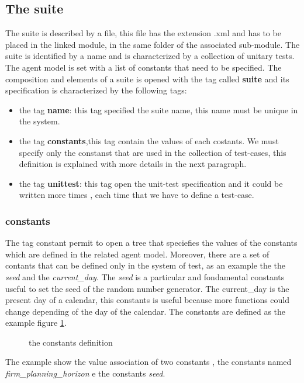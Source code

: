 \documentclass[a4paper,10pt]{article}
\begin{document}
\subsection{The suite}
The suite is described by a file, this file has the extension .xml and  has to be placed in the linked module, in the same folder of the associated sub-module. The suite is identified by a name and is characterized by a collection of unitary tests. The agent model is set with a list of constants that need to be specified.
The composition and elements of a suite is opened with the tag called \textbf{suite} and its specification is characterized by the following tags:

\begin{itemize}
\item the tag \textbf{name}: this tag specified the suite name, this name must be unique in the system.
\item the tag \textbf{constants},this tag contain the values of each costants. We must specify only the constanst that are used in the collection of test-cases, this definition is explained with more details in the next paragraph.
\item the tag \textbf{unittest}: this tag open the unit-test specification and it could be written more times , each time that we have to define a test-case.
\end{itemize}
\subsubsection{constants}
The tag constant permit to open a tree that speciefies the  values of the constants which are defined in the related agent model. Moreover, there are a set of contants that can be defined only in the system of test, as an example the the \textit{seed} and the \textit{current\_day}. The \textit{seed} is a particular and fondamental constants useful to set the seed of the random number generator. The current\_day is the present day of a calendar, this constants is useful because more functions could change depending of the day of the calendar.
The constants are defined as the example figure \ref{fig:fig3}.
\begin{figure}
\label{fig:fig3}

\caption{the constants definition }
\end{figure}
The example show the value association of two constants , the constants named \textit{firm\_planning\_horizon } e the constants \textit{seed}. 
\end{document}

